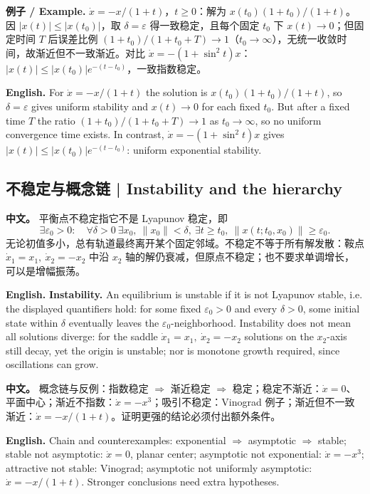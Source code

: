 \documentclass[UTF8,11pt,a4paper]{ctexart}
\newcommand{\EN}[1]{\par\noindent\textbf{English.} #1\par}
\newcommand{\EX}[2]{\par\noindent\textbf{例子 / Example.} #1\par\EN{#2}}
\newcommand{\APS}[2]{\par\noindent\textbf{中文。} #1\par\noindent\textbf{English.} #2\par}
\newcommand{\norm}[1]{\lVert #1\rVert}\newcommand{\abs}[1]{\lvert #1\rvert}
\begin{document}
\EX{$\dot x=-x/(1+t)$，$t\ge0$：解为 $x(t_0)(1+t_0)/(1+t)$。因 $\abs{x(t)}\le\abs{x(t_0)}$，取 $\delta=\varepsilon$ 得一致稳定，且每个固定 $t_0$ 下 $x(t)\to0$；但固定时间 $T$ 后误差比例 $(1+t_0)/(1+t_0+T)\to1$（$t_0\to\infty$），无统一收敛时间，故渐近但不一致渐近。对比 $\dot x=-(1+\sin^2t)x$：$\abs{x(t)}\le\abs{x(t_0)}e^{-(t-t_0)}$，一致指数稳定。}{For $\dot x=-x/(1+t)$ the solution is $x(t_0)(1+t_0)/(1+t)$, so $\delta=\varepsilon$ gives uniform stability and $x(t)\to0$ for each fixed $t_0$. But after a fixed time $T$ the ratio $(1+t_0)/(1+t_0+T)\to1$ as $t_0\to\infty$, so no uniform convergence time exists. In contrast, $\dot x=-(1+\sin^2t)x$ gives $\abs{x(t)}\le\abs{x(t_0)}e^{-(t-t_0)}$: uniform exponential stability.}

\subsection{不稳定与概念链 | Instability and the hierarchy}
\APS{平衡点不稳定指它不是 Lyapunov 稳定，即
\[
\exists\varepsilon_0>0:\quad\forall\delta>0\ \exists x_0,\ \norm{x_0}<\delta,\ \exists t\ge t_0,\ \norm{x(t;t_0,x_0)}\ge\varepsilon_0 .
\]
无论初值多小，总有轨道最终离开某个固定邻域。不稳定不等于所有解发散：鞍点 $\dot x_1=x_1,\ \dot x_2=-x_2$ 中沿 $x_2$ 轴的解仍衰减，但原点不稳定；也不要求单调增长，可以是增幅振荡。}{\textbf{Instability.} An equilibrium is unstable if it is not Lyapunov stable, i.e. the displayed quantifiers hold: for some fixed $\varepsilon_0>0$ and every $\delta>0$, some initial state within $\delta$ eventually leaves the $\varepsilon_0$-neighborhood. Instability does not mean all solutions diverge: for the saddle $\dot x_1=x_1,\ \dot x_2=-x_2$ solutions on the $x_2$-axis still decay, yet the origin is unstable; nor is monotone growth required, since oscillations can grow.}

\APS{概念链与反例：指数稳定 $\Rightarrow$ 渐近稳定 $\Rightarrow$ 稳定；稳定不渐近：$\dot x=0$、平面中心；渐近不指数：$\dot x=-x^3$；吸引不稳定：Vinograd 例子；渐近但不一致渐近：$\dot x=-x/(1+t)$。证明更强的结论必须付出额外条件。}{Chain and counterexamples: exponential $\Rightarrow$ asymptotic $\Rightarrow$ stable; stable not asymptotic: $\dot x=0$, planar center; asymptotic not exponential: $\dot x=-x^3$; attractive not stable: Vinograd; asymptotic not uniformly asymptotic: $\dot x=-x/(1+t)$. Stronger conclusions need extra hypotheses.}
\end{document}
